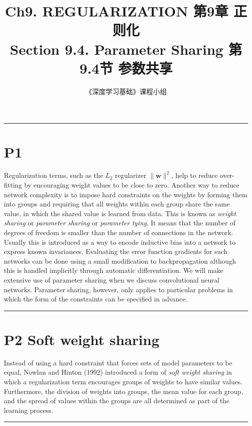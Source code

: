\documentclass{article}
\title{Ch9. REGULARIZATION \hfill 第9章 正则化 \\ 
Section 9.4. Parameter Sharing \hfill 第9.4节 参数共享}
\author{《深度学习基础》课程小组}
\begin{document}
\maketitle

\setlength{\parindent}{0pt} %
\setlength{\parskip}{1.5em} %

\noindent\rule{\linewidth}{0.4pt}

\section{P1}

Regularization terms, such as the $L_2$ regularizer $\|\mathbf{w}\|^2$, help to reduce over-fitting by encouraging weight values to be close to zero. Another way to reduce network complexity is to impose hard constraints on the weights by forming them into groups and requiring that all weights within each group share the same value, in which the shared value is learned from data. This is known as \emph{weight sharing} or \emph{parameter sharing} or \emph{parameter tying}. It means that the number of degrees of freedom is smaller than the number of connections in the network. Usually this is introduced as a way to encode inductive bias into a network to express known invariances. Evaluating the error function gradients for such networks can be done using a small modification to backpropagation although this is handled implicitly through automatic differentiation. We will make extensive use of parameter sharing when we discuss convolutional neural networks. Parameter sharing, however, only applies to particular problems in which the form of the constraints can be specified in advance.

\noindent\rule{\linewidth}{0.4pt}

\section{P2 Soft weight sharing}

Instead of using a hard constraint that forces sets of model parameters to be equal, Nowlan and Hinton (1992) introduced a form of \emph{soft weight sharing} in which a regularization term encourages groups of weights to have similar values. Furthermore, the division of weights into groups, the mean value for each group, and the spread of values within the groups are all determined as part of the learning process.

\noindent\rule{\linewidth}{0.4pt}
\end{document}
